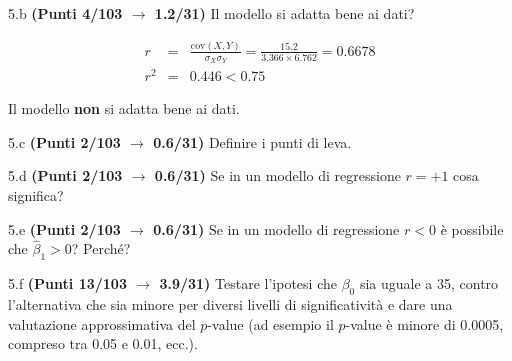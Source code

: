 \documentclass[
  11pt,
]{book}
\theoremstyle{mytheoremstyle}
\theoremstyle{mydefstyle}
\newenvironment{sol}
  {
  \begin{tcolorbox}[enhanced,breakable,arc=0.1mm,boxrule=1pt,colback=white,colframe=iblue,
  title=\bf \fontfamily{lmss}\selectfont \hspace{.5 cm} Soluzione,drop fuzzy shadow]

}{
\end{tcolorbox}
  }
\begin{document}
5.b \textbf{(Punti 4/103 \(\rightarrow\) 1.2/31)} Il modello si adatta bene ai dati?

\begin{sol}
\begin{eqnarray*}
r&=&\frac{\text{cov}(X,Y)}{\sigma_X\sigma_Y}=\frac{ 15.2 }{ 3.366 \times 6.762 }= 0.6678 \\ 
r^2&=& 0.446 < 0.75
\end{eqnarray*}

Il modello \textbf{non} si adatta bene ai dati.

\end{sol}

5.c \textbf{(Punti 2/103 \(\rightarrow\) 0.6/31)} Definire i punti di leva.

5.d \textbf{(Punti 2/103 \(\rightarrow\) 0.6/31)} Se in un modello di regressione \(r=+1\) cosa significa?

5.e \textbf{(Punti 2/103 \(\rightarrow\) 0.6/31)} Se in un modello di regressione \(r<0\) è possibile che \(\hat\beta_1>0\)? Perché?

5.f \textbf{(Punti 13/103 \(\rightarrow\) 3.9/31)} Testare l'ipotesi che \(\beta_0\) sia uguale a 35, contro l'alternativa che sia minore per diversi livelli di significatività e dare una valutazione approssimativa del \(p\)-value (ad esempio il \(p\)-value è minore di 0.0005, compreso tra 0.05 e 0.01, ecc.).
\end{document}
